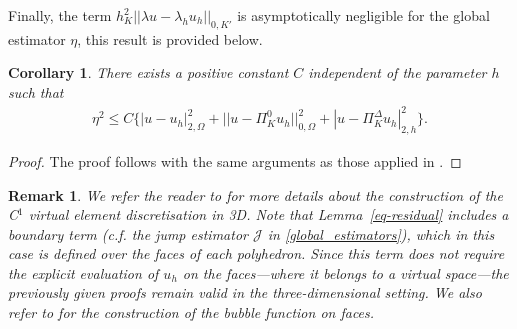 \documentclass[final,reqno]{elsarticle}
\newtheorem{remark}{Remark}[section]
\newtheorem{corollary}{Corollary}[section]
\def\O{\Omega}
\def\PiK{\Pi_{K}^{\Delta}}
\begin{document}
Finally, the term $h_K^2||\lambda u-\lambda_h u_h ||_{0,K'}$ is asymptotically negligible for the global estimator $\eta$, this result is provided below.
\begin{corollary}\label{global_eff}
	There exists a positive constant $C$ independent of the parameter $h$ such that 
	\begin{align}
		\eta^2\leq C \Big\{|u-u_h|_{2,\O}^2+|| u-\Pi_K^0 u_h||_{0,\Omega}^2+|u-\PiK u_h|_{2,h}^2\Big\}\nonumber. 
	\end{align}
\end{corollary}
\begin{proof}
The proof follows with the same arguments as those applied in  \cite[Corollary~5.14]{MR2019}.
\end{proof}
\begin{remark}
    We refer the reader to \cite{C1VEM_Polyhedral} for more details about the construction of the C$^1$ virtual element discretisation in 3D. Note that Lemma~\ref{eq-residual} includes a boundary term (c.f. the jump estimator $\mathcal{J}$ in \eqref{global_estimators}), which in this case is defined over the faces of each polyhedron. Since this term does not require the explicit evaluation of $u_h$ on the faces—where it belongs to a virtual space—the previously given proofs remain valid in the three-dimensional setting. We also refer to \cite{cangiani2017posteriori} for the construction of the bubble function on faces.
\end{remark}

\end{document}
